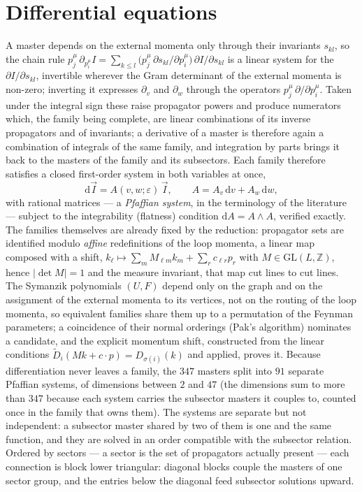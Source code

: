 \documentclass[11pt]{article}
\newcommand{\eps}{\varepsilon}
\newcommand{\dd}{\mathrm{d}}
\newcommand{\Z}{\mathbb{Z}}
\begin{document}
\section{Differential equations}
A master depends on the external momenta only through their
invariants $s_{kl}$, so the chain rule
$p_j^\mu\,\partial_{p_i^\mu} I = \sum_{k\le l}
\big(p_j^\mu\,\partial s_{kl}/\partial p_i^\mu\big)\,
\partial I/\partial s_{kl}$ is a linear system for the
$\partial I/\partial s_{kl}$, invertible wherever the Gram
determinant of the external momenta is non-zero; inverting it
expresses $\partial_v$ and $\partial_w$ through the operators
$p_j^\mu\,\partial/\partial p_i^\mu$.  Taken under the integral sign
these raise propagator powers and produce numerators which, the
family being complete, are linear combinations of its inverse
propagators and of invariants; a derivative of a master is therefore
again a combination of integrals of the same family, and
integration by parts brings it back to the masters of the family and
its subsectors.  Each family therefore satisfies a closed first-order
system in both variables at once,
\begin{equation}
  \dd \vec I = A(v,w;\eps)\,\vec I,
  \qquad A = A_v\,\dd v + A_w\,\dd w ,
\end{equation}
with rational matrices --- a \emph{Pfaffian system}, in the
terminology of the literature --- subject to the integrability
(flatness) condition $\dd A = A\wedge A$, verified exactly.  The
families themselves are already fixed by the reduction: propagator
sets are identified modulo \emph{affine} redefinitions of the loop
momenta, a linear map composed with a shift,
$k_\ell \mapsto \sum_m M_{\ell m} k_m + \sum_r c_{\ell r} p_r$ with
$M \in \mathrm{GL}(L,\Z)$, hence $\lvert\det M\rvert = 1$ and the
measure invariant, that map cut lines to cut lines.  The Symanzik
polynomials $(U,F)$ depend only on the graph and on the assignment of
the external momenta to its vertices, not on the routing of the loop
momenta, so equivalent families share them up to a permutation of the
Feynman parameters; a coincidence of their normal orderings (Pak's
algorithm) nominates a candidate, and the explicit momentum shift,
constructed from the linear conditions
$\widetilde D_i(Mk + c\cdot p) = D_{\sigma(i)}(k)$ and applied,
proves it.  Because differentiation never leaves a family, the $347$
masters split into $91$ separate Pfaffian systems, of dimensions
between $2$
and $47$ (the dimensions sum to more than $347$ because each system
carries the subsector masters it couples to, counted once in the
family that owns them).  The systems are separate but not
independent: a subsector master shared by two of them is one and the
same function, and they are solved in an order compatible with the
subsector relation.  Ordered by sectors ---
a sector is the set of propagators actually present --- each
connection is block lower triangular: diagonal blocks couple the
masters of one sector group, and the entries below the diagonal
feed subsector solutions upward.
\end{document}
